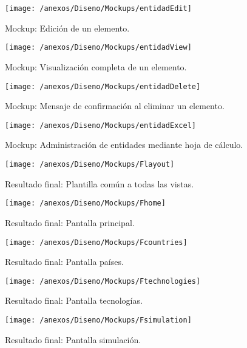 \begin{figure}[h]
	\centering
	\texttt{[image: /anexos/Diseno/Mockups/entidadEdit]}
	\caption{Mockup: Edición de un elemento.}
	\label{img:entidadEdit}
\end{figure}

\begin{figure}[h]
	\centering
	\texttt{[image: /anexos/Diseno/Mockups/entidadView]}
	\caption{Mockup: Visualización completa de un elemento.}
	\label{img:entidadView}
\end{figure}

\begin{figure}[h]
	\centering
	\texttt{[image: /anexos/Diseno/Mockups/entidadDelete]}
	\caption{Mockup: Mensaje de confirmación al eliminar un elemento.}
	\label{img:entidadDelete}
\end{figure}

\begin{figure}[h]
	\centering
	\texttt{[image: /anexos/Diseno/Mockups/entidadExcel]}
	\caption{Mockup: Administración de entidades mediante hoja de cálculo.}
	\label{img:entidadExcel}
\end{figure}


\begin{figure}[h]
	\centering
	\texttt{[image: /anexos/Diseno/Mockups/Flayout]}
	\caption{Resultado final: Plantilla común a todas las vistas.}
	\label{img:Flayout}
\end{figure}

\begin{figure}[h]
	\centering
	\texttt{[image: /anexos/Diseno/Mockups/Fhome]}
	\caption{Resultado final: Pantalla principal.}
	\label{img:Fhome}
\end{figure}

\begin{figure}[h]
	\centering
	\texttt{[image: /anexos/Diseno/Mockups/Fcountries]}
	\caption{Resultado final: Pantalla países.}
	\label{img:Fcountries}
\end{figure}

\begin{figure}[h]
	\centering
	\texttt{[image: /anexos/Diseno/Mockups/Ftechnologies]}
	\caption{Resultado final: Pantalla tecnologías.}
	\label{img:Ftechnologies}
\end{figure}

\begin{figure}[h]
	\centering
	\texttt{[image: /anexos/Diseno/Mockups/Fsimulation]}
	\caption{Resultado final: Pantalla simulación.}
	\label{img:Fsimulation}
\end{figure}

